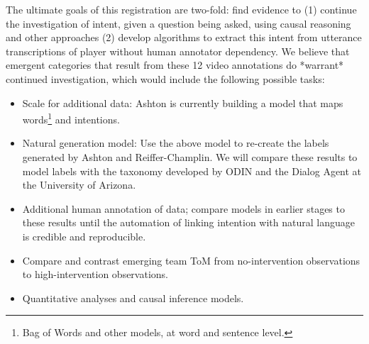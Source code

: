 The ultimate goals of this registration are two-fold: find evidence to (1)
continue the investigation of intent, given a question being asked, using
causal reasoning and other approaches (2) develop algorithms to extract this
intent from utterance transcriptions of player without human annotator
dependency. We believe that emergent categories that result from these 12 video
annotations do *warrant* continued investigation, which would include the
following possible tasks:

\begin{itemize}
    \item Scale for additional data: Ashton is currently building a model that maps words\footnote{Bag of Words and other models, at word and sentence level.} and intentions.
    \item Natural generation model: Use the above model to re-create the labels
        generated by Ashton and Reiffer-Champlin. We will compare these results
        to model labels with the taxonomy developed by ODIN and the Dialog
        Agent at the University of Arizona.
    \item Additional human annotation of data; compare models in earlier stages to these results until the automation of linking intention with natural language is credible and reproducible.
    \item Compare and contrast emerging team ToM from no-intervention observations to high-intervention observations.
    \item Quantitative analyses and causal inference models.
\end{itemize}



